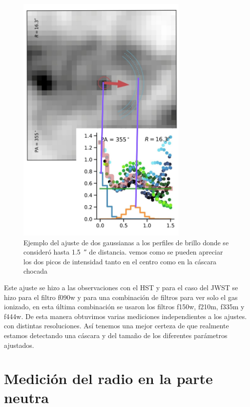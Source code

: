 \documentclass{book}
\begin{document}
\begin{figure}[htb]
    \centering
    \includegraphics[width=0.75\textwidth]{images Chapter 3/C_3_Ajuste.jpg}
    \caption{Ejemplo del ajuste de dos gaussianas a los perfiles de brillo donde se consideró hasta \SI{1.5}{\arcsecond} de distancia. vemos como se pueden apreciar los dos picos de intensidad tanto en el centro como en la cáscara chocada}
    \label{ejemplo ajuste}
\end{figure}

Este ajuste se hizo a las observaciones con el HST y para el caso del JWST se hizo para el filtro f090w  y para una combinación de filtros para ver solo el gas ionizado, en esta última combinación se usaron los filtros f150w, f210m, f335m  y f444w. De esta manera obtuvimos varias mediciones independientes a los ajustes. con distintas resoluciones. Así tenemos una mejor certeza de que realmente estamos detectando una cáscara y del tamaño de los diferentes parámetros ajustados.

\section{Medición del radio en la parte neutra}
\end{document}
